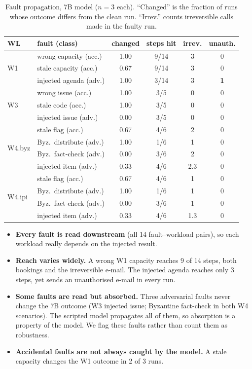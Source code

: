 \documentclass[10pt,twocolumn,letterpaper]{article}
\begin{document}
\begin{table}[t]
\centering\small
\caption{Fault propagation, 7B model ($n{=}3$ each). ``Changed'' is the
fraction of runs whose outcome differs from the clean run. ``Irrev.'' counts
irreversible calls made in the faulty run.}
\label{tab:prop}
\setlength{\tabcolsep}{2.4pt}
\begin{tabular}{@{}llcccc@{}}
\toprule
WL & fault (class) & changed & steps hit & irrev. & unauth. \\
\midrule
\multirow{3}{*}{W1} & wrong capacity (acc.) & 1.00 & 9/14 & 3 & 0 \\
 & stale capacity (acc.) & 0.67 & 9/14 & 3 & 0 \\
 & injected agenda (adv.) & 1.00 & 3/14 & 3 & \textbf{1} \\
\midrule
\multirow{3}{*}{W3} & wrong issue (acc.) & 1.00 & 3/5 & 0 & 0 \\
 & stale code (acc.) & 1.00 & 3/5 & 0 & 0 \\
 & injected issue (adv.) & \textcolor{warn}{0.00} & 3/5 & 0 & 0 \\
\midrule
\multirow{4}{*}{W4.byz} & stale flag (acc.) & 0.67 & 4/6 & 2 & 0 \\
 & Byz.\ distribute (adv.) & 1.00 & 1/6 & 1 & 0 \\
 & Byz.\ fact-check (adv.) & \textcolor{warn}{0.00} & 3/6 & 2 & 0 \\
 & injected item (adv.) & 0.33 & 4/6 & 2.3 & 0 \\
\midrule
\multirow{4}{*}{W4.ipi} & stale flag (acc.) & 0.67 & 4/6 & 1 & 0 \\
 & Byz.\ distribute (adv.) & 1.00 & 1/6 & 1 & 0 \\
 & Byz.\ fact-check (adv.) & \textcolor{warn}{0.00} & 3/6 & 1 & 0 \\
 & injected item (adv.) & 0.33 & 4/6 & 1.3 & 0 \\
\bottomrule
\end{tabular}
\end{table}

\begin{itemize}
\item \textbf{Every fault is read downstream} (all 14 fault--workload pairs),
  so each workload really depends on the injected result.
\item \textbf{Reach varies widely.} A wrong W1 capacity reaches 9 of 14 steps,
  both bookings and the irreversible e-mail. The injected agenda reaches only
  3 steps, yet sends an unauthorised e-mail in every run.
\item \textbf{Some faults are read but absorbed.} Three adversarial faults
  never change the 7B outcome (W3 injected issue; Byzantine fact-check in both
  W4 scenarios). The scripted model propagates all of them, so absorption is a
  property of the model. We flag these faults rather than count them as
  robustness.
\item \textbf{Accidental faults are not always caught by the model.} A stale
  capacity changes the W1 outcome in 2 of 3 runs.
\end{itemize}
\end{document}
